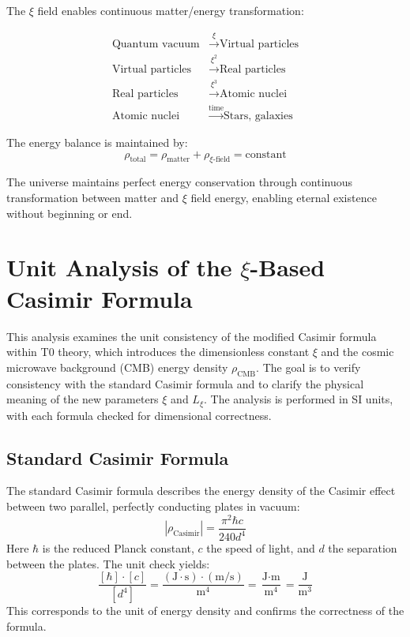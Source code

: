 	The $\xi$ field enables continuous matter/energy transformation:
	
	\begin{align}
		\text{Quantum vacuum} &\xrightarrow{\xi} \text{Virtual particles} \\
		\text{Virtual particles} &\xrightarrow{\xi^2} \text{Real particles} \\
		\text{Real particles} &\xrightarrow{\xi^3} \text{Atomic nuclei} \\
		\text{Atomic nuclei} &\xrightarrow{\text{time}} \text{Stars, galaxies}
	\end{align}
	
	The energy balance is maintained by:
	\begin{equation}
		\rho_{\text{total}} = \rho_{\text{matter}} + \rho_{\xi\text{-field}} = \text{constant}
	\end{equation}
	
	\begin{important}
		The universe maintains perfect energy conservation through continuous transformation between matter and $\xi$ field energy, enabling eternal existence without beginning or end.
	\end{important}
	
	\section{Unit Analysis of the $\xi$-Based Casimir Formula}
	
	This analysis examines the unit consistency of the modified Casimir formula within T0 theory, which introduces the dimensionless constant $\xi$ and the cosmic microwave background (CMB) energy density $\rho_{\text{CMB}}$. The goal is to verify consistency with the standard Casimir formula and to clarify the physical meaning of the new parameters $\xi$ and $L_\xi$. The analysis is performed in SI units, with each formula checked for dimensional correctness.
	
	\subsection{Standard Casimir Formula}
	The standard Casimir formula describes the energy density of the Casimir effect between two parallel, perfectly conducting plates in vacuum:
	\begin{equation}
		|\rho_{\text{Casimir}}| = \frac{\pi^2 \hbar c}{240 d^4}
	\end{equation}
	Here $\hbar$ is the reduced Planck constant, $c$ the speed of light, and $d$ the separation between the plates. The unit check yields:
	\begin{equation}
		\frac{[\hbar] \cdot [c]}{[d^4]} = \frac{(\text{J} \cdot \text{s}) \cdot (\text{m}/\text{s})}{\text{m}^4} = \frac{\text{J} \cdot \text{m}}{\text{m}^4} = \frac{\text{J}}{\text{m}^3}
	\end{equation}
	This corresponds to the unit of energy density and confirms the correctness of the formula.
	
